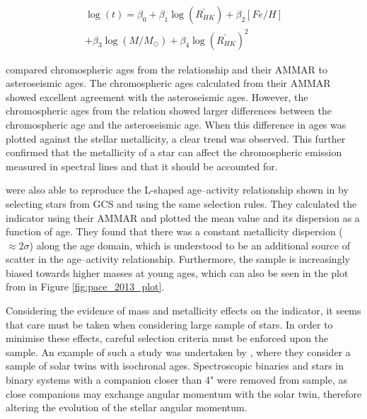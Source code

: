 \begin{equation}
\begin{aligned}
    \log(t) = \beta_{0} + \beta_{1}\log(R^{'}_{HK}) + \beta_{2}[Fe/H]\\ + \beta_{3}\log(M/M_{\odot}) + \beta_{4}\log(R^{'}_{HK})^{2}
    \label{Eq:AMMAR}
\end{aligned}
\end{equation}

\citet{Lorenzo_Oliveira_etal_2016} compared chromospheric ages from the \citet{Mamajek_Hillenbrand_2008} relationship and their AMMAR to asteroseismic ages. The chromospheric ages calculated from their AMMAR showed excellent agreement with the asteroseismic ages. However, the chromospheric ages from the \citet{Mamajek_Hillenbrand_2008} relation showed larger differences between the chromospheric age and the asteroseismic age. When this difference in ages was plotted against the stellar metallicity, a clear trend was observed. This further confirmed that the metallicity of a star can affect the chromospheric emission measured in \caII spectral lines and that it should be accounted for.

\citet{Lorenzo_Oliveira_etal_2016} were also able to reproduce the L-shaped age--activity relationship shown in \citet{Pace_2013} by selecting stars from GCS and using the same selection rules. They calculated the \Rprime indicator using their AMMAR and plotted the mean value and its dispersion as a function of age. They found that there was a constant metallicity dispersion ($\approx 2\sigma$) along the age domain, which is understood to be an additional source of scatter in the age--activity relationship. Furthermore, the sample is increasingly biased towards higher masses at young ages, which can also be seen in the plot from \citet{Pace_2013} in Figure \ref{fig:pace_2013_plot}.

Considering the evidence of mass and metallicity effects on the \Rprime indicator, it seems that care must be taken when considering large sample of stars. In order to minimise these effects, careful selection criteria must be enforced upon the sample. An example of such a study was undertaken by \citet{Lorenzo_Oliveira_etal_2018}, where they consider a sample of solar twins with isochronal ages. Spectroscopic binaries and stars in binary systems with a companion closer than 4" were removed from sample, as close companions may exchange angular momentum with the solar twin, therefore altering the evolution of the stellar angular momentum.

